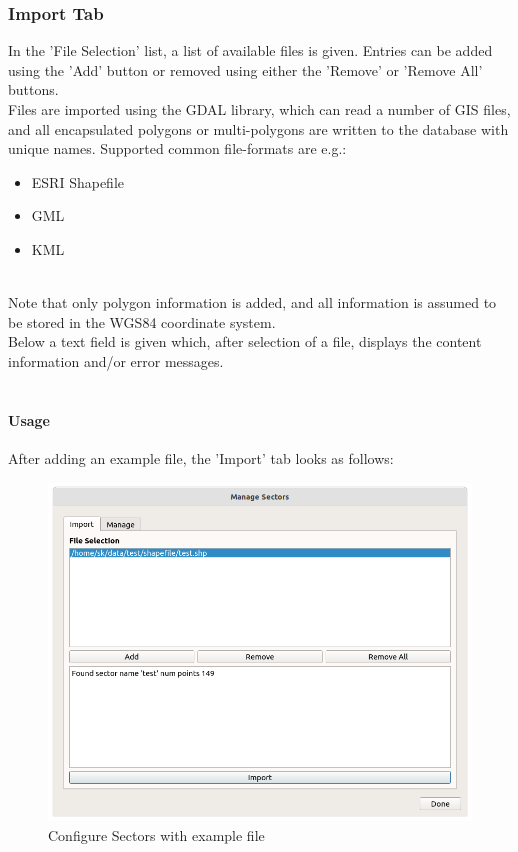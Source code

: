 \subsubsection {Import Tab}

In the 'File Selection' list, a list of available files is given. Entries can be added using the 'Add' button or removed using either the 'Remove' or 'Remove All' buttons. \\

Files are imported using the GDAL library, which can read a number of GIS files, and all encapsulated polygons or multi-polygons are written to the database with unique names. Supported common file-formats are e.g.:

\begin{itemize}
\item ESRI Shapefile
\item GML
\item KML
\end{itemize}
\ \\

Note that only polygon information is added, and all information is assumed to be stored in the WGS84 coordinate system. \\

Below a text field is given which, after selection of a file, displays the content information and/or error messages. \\\

\paragraph {Usage}

After adding an example file, the 'Import' tab looks as follows:

\begin{figure}[H]
    \includegraphics[width=15cm]{figures/configure_sectors_ready.png}
  \caption{Configure Sectors with example file}
\end{figure}

